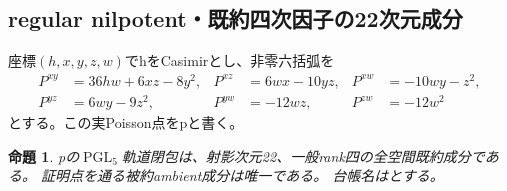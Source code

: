 \documentclass[a4paper,11pt]{ltjsarticle}
\newtheorem{proposition}{命題}[section]
\theoremstyle{definition}
\newcommand{\PGL}{\operatorname{PGL}}
\begin{document}
\subsection{regular nilpotent・既約四次因子の22次元成分}
座標$(h,x,y,z,w)$でhをCasimirとし、非零六括弧を
\[
\begin{aligned}
 P^{xy}&=36hw+6xz-8y^2,&P^{xz}&=6wx-10yz,&P^{xw}&=-10wy-z^2,\\
 P^{yz}&=6wy-9z^2,&P^{yw}&=-12wz,&P^{zw}&=-12w^2
\end{aligned}
\]
とする。この実Poisson点をpと書く。
\begin{proposition}\label{prop:nil4-hyperplane-quartic-component}
pの$\PGL_5$軌道閉包は、射影次元22、一般rank四の全空間既約成分である。
証明点を通る被約ambient成分は唯一である。
台帳名はとする。
\end{proposition}
\end{document}

